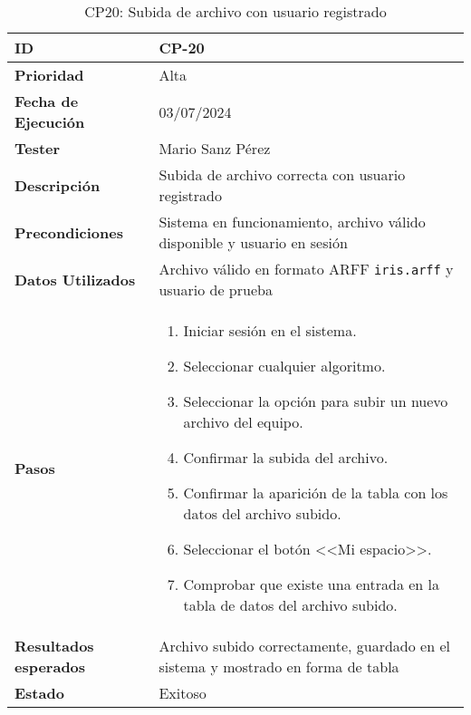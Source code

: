 \begin{table}[ht]
	\centering
	\renewcommand{\arraystretch}{1.5} %
	\begin{tabular}{>{\raggedright\arraybackslash}p{4cm} p{9.5cm}}
    \hline
    \rowcolor{gray!20}
    \textbf{ID} & CP-20\\
    \hline
    \rowcolor{white}
    \textbf{Prioridad} & Alta \\
    \hline
    \rowcolor{gray!20}
    \textbf{Fecha de Ejecución} & 03/07/2024 \\
    \hline
    \rowcolor{white}
    \textbf{Tester} & Mario Sanz Pérez \\
    \hline
    \rowcolor{gray!20}
    \textbf{Descripción} & Subida de archivo correcta con usuario registrado\\
    \hline
    \rowcolor{white}
    \textbf{Precondiciones} & Sistema en funcionamiento, archivo válido disponible y usuario en sesión\\
    \hline
    \rowcolor{white}
    \textbf{Datos Utilizados} & Archivo válido en formato ARFF \texttt{iris.arff} y usuario de prueba\\
    \hline
    \rowcolor{gray!20}
    \textbf{Pasos} & \begin{enumerate}
        \item Iniciar sesión en el sistema.
        \item Seleccionar cualquier algoritmo.
        \item Seleccionar la opción para subir un nuevo archivo del equipo.
        \item Confirmar la subida del archivo.
        \item Confirmar la aparición de la tabla con los datos del archivo subido.
        \item Seleccionar el botón <<Mi espacio>>.
        \item Comprobar que existe una entrada en la tabla de datos del archivo subido.
    \end{enumerate}\\
	\hline
    \rowcolor{gray!20}
    \textbf{Resultados esperados} & Archivo subido correctamente, guardado en el sistema y mostrado en forma de tabla\\
    \hline
    \rowcolor{white}
    \textbf{Estado} & Exitoso\\
    \hline
\end{tabular}
	\caption[CP20: Subida de archivo con usuario registrado]{CP20: Subida de archivo con usuario registrado}
\end{table}

